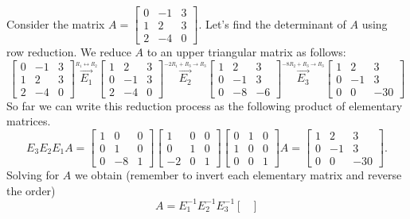 \begin{example}
Consider the matrix $A=
\begin{bmatrix}
0&-1&3\\
1&2&3\\
2&-4&0
\end{bmatrix}
$.  
Let's find the determinant of $A$ using row reduction.
We reduce $A$ to an upper triangular matrix as follows:
$$\begin{bmatrix}
0&-1&3\\
1&2&3\\
2&-4&0
\end{bmatrix}
\stackrel{\xrightarrow{R_1 \leftrightarrow R_2}}{E_1}
\begin{bmatrix}
1&2&3\\
0&-1&3\\
2&-4&0
\end{bmatrix}
\stackrel{\xrightarrow{-2R_1 + R_3\to R_3}}{E_2}
\begin{bmatrix}
 1 & 2 & 3 \\
 0 & -1 & 3 \\
 0 & -8 & -6
\end{bmatrix}
\stackrel{\xrightarrow{-8R_2+R_3\to R_3}}{E_3}
\begin{bmatrix}
 1 & 2 & 3 \\
 0 & -1 & 3 \\
 0 & 0 & -30
\end{bmatrix}
$$
So far we can write this reduction process as the following product of elementary matrices.
$$E_3E_2E_1A=
\begin{bmatrix}
 1 & 0 & 0 \\
 0 & 1 & 0 \\
 0 & -8 & 1
\end{bmatrix}
\begin{bmatrix}
 1 & 0 & 0 \\
 0 & 1 & 0 \\
 -2 & 0 & 1
\end{bmatrix}
\begin{bmatrix}
 0 & 1 & 0 \\
 1 & 0 & 0 \\
 0 & 0 & 1
\end{bmatrix}
A=\begin{bmatrix}
 1 & 2 & 3 \\
 0 & -1 & 3 \\
 0 & 0 & -30
\end{bmatrix}.
$$
Solving for $A$ we obtain (remember to invert each elementary matrix and reverse the order)
$$
A=E_1^{-1}E_2^{-1}E_3^{-1}\begin{bmatrix}

\end{bmatrix}$$
\end{example}

